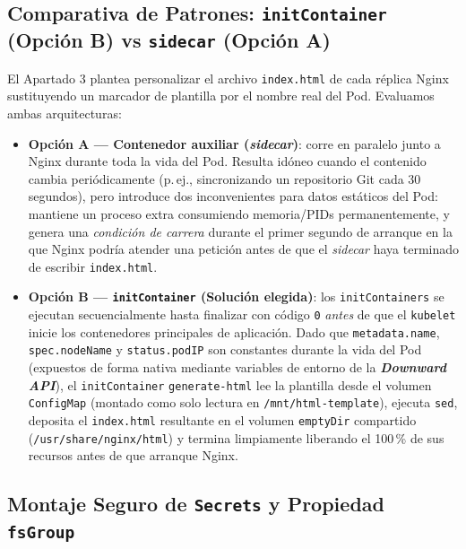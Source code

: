 \subsection{Comparativa de Patrones: \texttt{initContainer} (Opción B) vs \texttt{sidecar} (Opción A)}

El Apartado 3 plantea personalizar el archivo \texttt{index.html} de cada réplica Nginx sustituyendo un marcador de plantilla por el nombre real del Pod. Evaluamos ambas arquitecturas:
\begin{itemize}
  \item \textbf{Opción A --- Contenedor auxiliar (\textit{sidecar})}: corre en paralelo junto a Nginx durante toda la vida del Pod. Resulta idóneo cuando el contenido cambia periódicamente (p.\,ej., sincronizando un repositorio Git cada 30 segundos), pero introduce dos inconvenientes para datos estáticos del Pod: mantiene un proceso extra consumiendo memoria/PIDs permanentemente, y genera una \emph{condición de carrera} durante el primer segundo de arranque en la que Nginx podría atender una petición antes de que el \textit{sidecar} haya terminado de escribir \texttt{index.html}.
  \item \textbf{Opción B --- \texttt{initContainer} (Solución elegida)}: los \texttt{initContainers} se ejecutan secuencialmente hasta finalizar con código \texttt{0} \emph{antes} de que el \texttt{kubelet} inicie los contenedores principales de aplicación. Dado que \texttt{metadata.name}, \texttt{spec.nodeName} y \texttt{status.podIP} son constantes durante la vida del Pod (expuestos de forma nativa mediante variables de entorno de la \textbf{\textit{Downward API}}), el \texttt{initContainer} \texttt{generate-html} lee la plantilla desde el volumen \texttt{ConfigMap} (montado como solo lectura en \texttt{/mnt/html-template}), ejecuta \texttt{sed}, deposita el \texttt{index.html} resultante en el volumen \texttt{emptyDir} compartido (\texttt{/usr/share/nginx/html}) y termina limpiamente liberando el 100\,\% de sus recursos antes de que arranque Nginx.
\end{itemize}

\subsection{Montaje Seguro de \texttt{Secrets} y Propiedad \texttt{fsGroup}}

